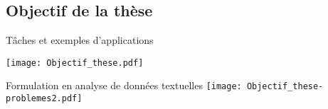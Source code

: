 \subsection{Objectif de la thèse}
\begin{frame}[c]{\mysubsectiontitle}
	Tâches et exemples d'applications
		
	\texttt{[image: Objectif\_these.pdf]}	
\end{frame}

\begin{frame}[c]{\mysubsectiontitle}	
	Formulation en analyse de données textuelles	\texttt{[image: Objectif\_these-problemes2.pdf]}		
\end{frame}
